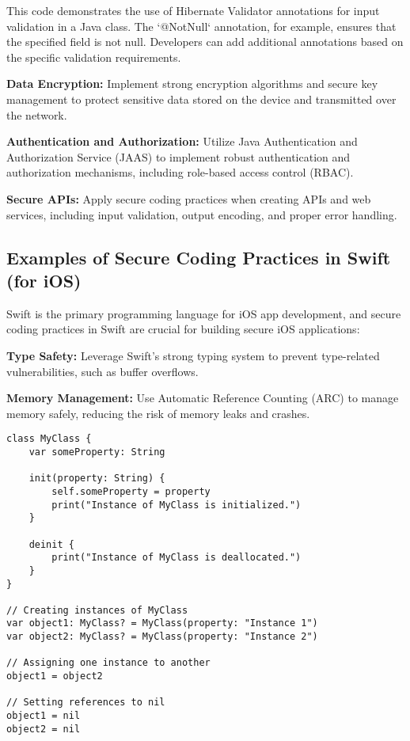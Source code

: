\documentclass[conference]{IEEEtran}
\begin{document}
This code demonstrates the use of Hibernate Validator annotations for input validation in a Java class. The `@NotNull` annotation, for example, ensures that the specified field is not null. Developers can add additional annotations based on the specific validation requirements.


\textbf{Data Encryption:} Implement strong encryption algorithms and secure key management to protect sensitive data stored on the device and transmitted over the network.

\textbf{Authentication and Authorization:} Utilize Java Authentication and Authorization Service (JAAS) to implement robust authentication and authorization mechanisms, including role-based access control (RBAC).

\textbf{Secure APIs:} Apply secure coding practices when creating APIs and web services, including input validation, output encoding, and proper error handling.

\subsection{Examples of Secure Coding Practices in Swift (for iOS)}

Swift is the primary programming language for iOS app development, and secure coding practices in Swift are crucial for building secure iOS applications:

\textbf{Type Safety:} Leverage Swift's strong typing system to prevent type-related vulnerabilities, such as buffer overflows.

\textbf{Memory Management:} Use Automatic Reference Counting (ARC) to manage memory safely, reducing the risk of memory leaks and crashes.

\begin{lstlisting}[style=swiftStyle, caption={Memory Management using Automatic Reference Counting (ARC) in Swift}]
class MyClass {
    var someProperty: String

    init(property: String) {
        self.someProperty = property
        print("Instance of MyClass is initialized.")
    }

    deinit {
        print("Instance of MyClass is deallocated.")
    }
}

// Creating instances of MyClass
var object1: MyClass? = MyClass(property: "Instance 1")
var object2: MyClass? = MyClass(property: "Instance 2")

// Assigning one instance to another
object1 = object2

// Setting references to nil
object1 = nil
object2 = nil
\end{lstlisting}
\end{document}
